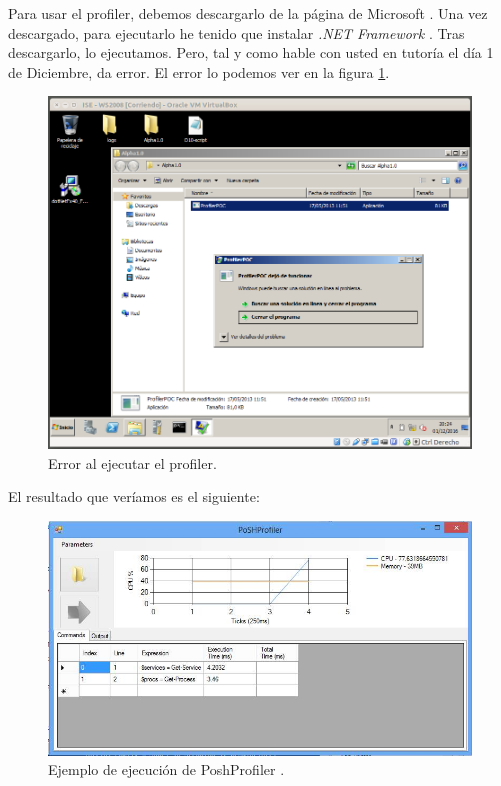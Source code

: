 \documentclass[a4paper,titlepage,12pt]{scrartcl}	%
\numberwithin{figure}{section} %
\numberwithin{table}{section} %
\begin{document}
	Para usar el profiler, debemos descargarlo de la página de Microsoft \cite{profiler_powershell}. Una vez descargado, para ejecutarlo he tenido que instalar \textit{.NET Framework} \cite{net_framework}. Tras descargarlo, lo ejecutamos. Pero, tal y como hable con usted en tutoría el día 1 de Diciembre, da error. El error lo podemos ver en la figura \ref{O10-error}.
	\begin{figure}[H]
		\centering
		\includegraphics[scale=0.43]{./Imagenes/O10-error.png}
		\caption[Error al ejecutar el profiler.]{Error al ejecutar el profiler.}
		\label{O10-error}
	\end{figure}
	
	El resultado que veríamos es el siguiente:
	
	\begin{figure}[H]
		\centering
		\includegraphics[scale=0.6]{./Imagenes/O10-profiler.png}
		\caption[Ejemplo de ejecución de PoshProfiler \cite{poshprofiler}.]{Ejemplo de ejecución de PoshProfiler \cite{poshprofiler}.}
		\label{O10-profiler}
	\end{figure}	
	
\end{document}
